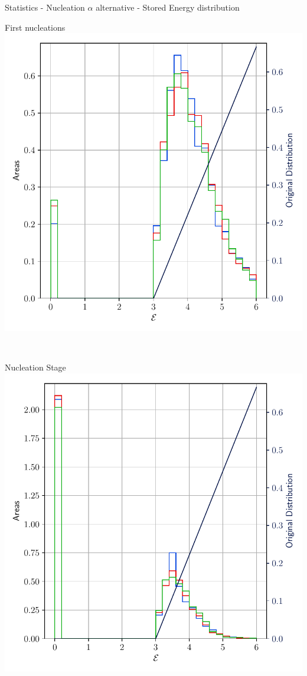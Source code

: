 \documentclass[usenames,dvipsnames]{beamer}
\begin{document}
\begin{frame}{Statistics - Nucleation $\alpha$ alternative - Stored Energy distribution}
\begin{minipage}{0.5\textwidth}
    \scriptsize
    First nucleations
    \includegraphics[trim={0 1em 0 1.1em},clip=true,scale=0.35]{figures/stored_energy/SE/se/000070_nuclalternative_set.pdf}
    \end{minipage}\\
    \begin{minipage}{0.5\textwidth}
    \centering
    \scriptsize
    Nucleation Stage
    \includegraphics[trim={0 1em 0 1.1em},clip=true,scale=0.35]{figures/stored_energy/SE/se/000110_nuclalternative_set.pdf}

\end{minipage}
\end{frame}
\end{document}
